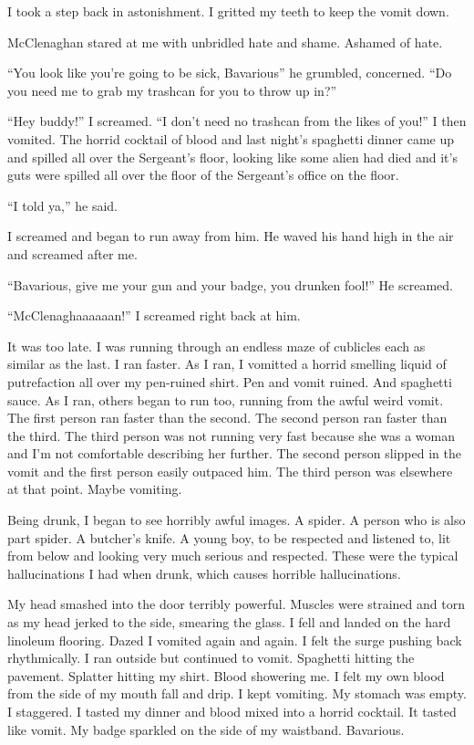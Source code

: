 I took a step back in astonishment. I gritted my teeth to keep the
vomit down.

McClenaghan stared at me with unbridled hate and shame. Ashamed of
hate.

``You look like you're going to be sick, Bavarious'' he grumbled,
concerned. ``Do you need me to grab my trashcan for you to throw up
in?''

``Hey buddy!'' I screamed. ``I don't need no trashcan from the likes
of you!'' I then vomited. The horrid cocktail of blood and last
night's spaghetti dinner came up and spilled all over the
Sergeant's floor, looking like some alien had died and it's guts
were spilled all over the floor of the Sergeant's office on the
floor.

``I told ya,'' he said.

I screamed and began to run away from him. He waved his hand high
in the air and screamed after me.

``Bavarious, give me your gun and your badge, you drunken fool!'' He
screamed.

``McClenaghaaaaaan!'' I screamed right back at him.

It was too late. I was running through an endless maze of cublicles
each as similar as the last. I ran faster. As I ran, I vomitted a
horrid smelling liquid of putrefaction all over my pen-ruined
shirt. Pen and vomit ruined. And spaghetti sauce. As I ran, others
began to run too, running from the awful weird vomit. The first
person ran faster than the second. The second person ran faster
than the third. The third person was not running very fast because
she was a woman and I'm not comfortable describing her further. The
second person slipped in the vomit and the first person easily
outpaced him. The third person was elsewhere at that point. Maybe
vomiting.

Being drunk, I began to see horribly awful images. A spider. A
person who is also part spider. A butcher's knife. A young boy, to
be respected and listened to, lit from below and looking very much
serious and respected. These were the typical hallucinations I had
when drunk, which causes horrible hallucinations.

My head smashed into the door terribly powerful. Muscles were
strained and torn as my head jerked to the side, smearing the
glass. I fell and landed on the hard linoleum flooring. Dazed I
vomited again and again. I felt the surge pushing back
rhythmically. I ran outside but continued to vomit. Spaghetti
hitting the pavement. Splatter hitting my shirt. Blood showering
me. I felt my own blood from the side of my mouth fall and drip. I
kept vomiting. My stomach was empty. I staggered. I tasted my
dinner and blood mixed into a horrid cocktail. It tasted like
vomit. My badge sparkled on the side of my waistband.
Bavarious.

